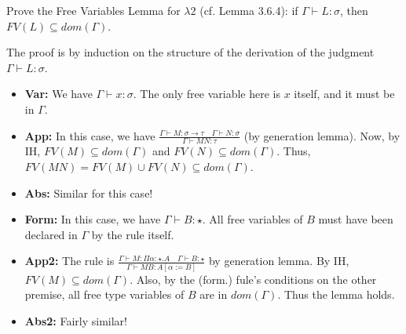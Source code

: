 \begin{problem}{3.20}
    Prove the Free Variables Lemma for $\lambda 2$ (cf. Lemma 3.6.4): if $\Gamma \vdash L : \sigma$, then $FV(L) \subseteq dom(\Gamma)$.
\end{problem}

\begin{solution}
    The proof is by induction on the structure of the derivation of the judgment $\Gamma \vdash L : \sigma$.
    \begin{itemize}
        \item \textbf{Var:} We have $\Gamma \vdash x : \sigma$. The only free variable here is $x$ itself, and it must be in $\Gamma$.
        \item \textbf{App:} In this case, we have $\frac{\Gamma \vdash M : \sigma \to \tau \quad \Gamma \vdash N : \sigma}{\Gamma \vdash MN : \tau}$ (by generation lemma).
                Now, by IH, $FV(M)\subseteq dom(\Gamma)$ and $FV(N) \subseteq dom(\Gamma)$. Thus, $FV(MN) = FV(M) \cup FV(N) \subseteq dom(\Gamma)$.
        \item \textbf{Abs:} Similar for this case!
        \item \textbf{Form:} In this case, we have $\Gamma \vdash B:\star$. All free variables of $B$ must have been declared in $\Gamma$ by the rule itself.
        \item \textbf{App2:} The rule is $\frac{\Gamma \vdash M:\Pi \alpha : \star.A \quad \Gamma \vdash B : \star}{\Gamma \vdash MB : A[\alpha := B]}$ by generation lemma. By IH, $FV(M) \subseteq dom(\Gamma)$. Also, by the (form.) fule's conditions on the other premise, all free type variables of $B$ are in $dom(\Gamma)$. Thus the lemma holds.
        \item \textbf{Abs2:} Fairly similar!
    \end{itemize}
\end{solution}